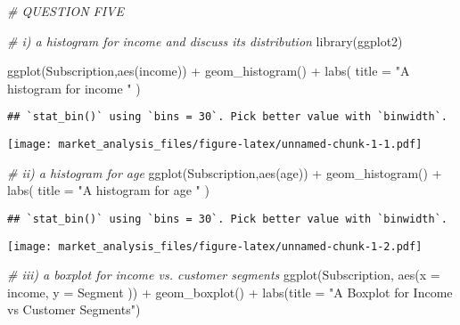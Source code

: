 \documentclass[
]{article}
\newenvironment{Shaded}{\begin{snugshade}}{\end{snugshade}}
\newcommand{\AttributeTok}[1]{\textcolor[rgb]{0.77,0.63,0.00}{#1}}
\newcommand{\CommentTok}[1]{\textcolor[rgb]{0.56,0.35,0.01}{\textit{#1}}}
\newcommand{\FunctionTok}[1]{\textcolor[rgb]{0.00,0.00,0.00}{#1}}
\newcommand{\NormalTok}[1]{#1}
\newcommand{\SpecialCharTok}[1]{\textcolor[rgb]{0.00,0.00,0.00}{#1}}
\newcommand{\StringTok}[1]{\textcolor[rgb]{0.31,0.60,0.02}{#1}}
\begin{document}
\begin{Shaded}
\begin{Highlighting}[]
\CommentTok{\# QUESTION FIVE}

\CommentTok{\# i) a histogram for income and discuss its distribution}
\FunctionTok{library}\NormalTok{(ggplot2)}

\FunctionTok{ggplot}\NormalTok{(Subscription,}\FunctionTok{aes}\NormalTok{(income)) }\SpecialCharTok{+} \FunctionTok{geom\_histogram}\NormalTok{() }\SpecialCharTok{+} \FunctionTok{labs}\NormalTok{(}
  \AttributeTok{title =} \StringTok{"A histogram for income "}
\NormalTok{)}
\end{Highlighting}
\end{Shaded}

\begin{verbatim}
## `stat_bin()` using `bins = 30`. Pick better value with `binwidth`.
\end{verbatim}

\texttt{[image: market\_analysis\_files/figure-latex/unnamed-chunk-1-1.pdf]}

\begin{Shaded}
\begin{Highlighting}[]
\CommentTok{\# ii) a histogram for age}
\FunctionTok{ggplot}\NormalTok{(Subscription,}\FunctionTok{aes}\NormalTok{(age)) }\SpecialCharTok{+} \FunctionTok{geom\_histogram}\NormalTok{() }\SpecialCharTok{+} \FunctionTok{labs}\NormalTok{(}
  \AttributeTok{title =} \StringTok{"A histogram for age "}
\NormalTok{)}
\end{Highlighting}
\end{Shaded}

\begin{verbatim}
## `stat_bin()` using `bins = 30`. Pick better value with `binwidth`.
\end{verbatim}

\texttt{[image: market\_analysis\_files/figure-latex/unnamed-chunk-1-2.pdf]}

\begin{Shaded}
\begin{Highlighting}[]
\CommentTok{\# iii) a boxplot for income vs. customer segments }
\FunctionTok{ggplot}\NormalTok{(Subscription, }\FunctionTok{aes}\NormalTok{(}\AttributeTok{x =}\NormalTok{ income, }\AttributeTok{y =}\NormalTok{ Segment )) }\SpecialCharTok{+} \FunctionTok{geom\_boxplot}\NormalTok{() }\SpecialCharTok{+}
  \FunctionTok{labs}\NormalTok{(}\AttributeTok{title =} \StringTok{"A Boxplot for Income vs Customer Segments"}\NormalTok{)}
\end{Highlighting}
\end{Shaded}
\end{document}
